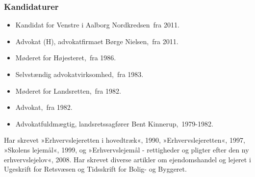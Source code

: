 \documentclass[11pt, a4paper]{awesome-cv}
\begin{document}
\begin{cvletter}
\subsubsection*{Kandidaturer}
\begin{itemize}
\item Kandidat for Venstre i Aalborg Nordkredsen fra 2011.
\end{itemize}
\begin{itemize}
\item Advokat (H), advokatfirmaet Børge Nielsen, fra 2011.
\item Møderet for Højesteret, fra 1986.
\item Selvstændig advokatvirksomhed, fra 1983.
\item Møderet for Landsretten, fra 1982.
\item Advokat, fra 1982.
\item Advokatfuldmægtig, landsretssagfører Bent Kinnerup, 1979-1982.
\end{itemize}
Har skrevet »Erhvervslejeretten i hovedtræk«, 1990, »Erhvervslejeretten«, 1997, »Skolens lejemål«, 1999, og »Erhvervslejemål - rettigheder og pligter efter den ny erhvervslejelov«, 2008. Har skrevet diverse artikler om ejendomshandel og lejeret i Ugeskrift for Retsvæsen og Tidsskrift for Bolig- og Byggeret.

\end{cvletter}
\end{document}
